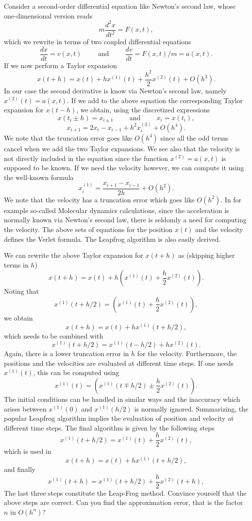 \documentclass[10pt]{article}
\begin{document}
Consider a second-order differential equation  like Newton's second law, whose one-dimensional 
version reads
\[
m\frac{d^2 x}{dt^2}= F(x,t),
\] 
which we rewrite in terms of two coupled differential equations
\[
\frac{dx}{dt}=v(x,t) \hspace{1cm}\mathrm{and}\hspace{1cm} \frac{dv}{dt}=F(x,t)/m=a(x,t).
\]
If we now perform a Taylor expansion 
\[
x(t+h) = x(t)+hx^{(1)}(t)+\frac{h^2}{2}x^{(2)}(t)+O(h^3).
\]
In our case the second derivative is know via Newton's second law, namely $x^{(2)}(t)=a(x,t)$. 
If we add to the above equation the corresponding Taylor expansion for $x(t-h)$, we obtain, using the 
discretized expressions 
\[
x(t_i\pm h) = x_{i\pm 1} \hspace{1cm}\mathrm{and}\hspace{1cm} x_i=x(t_i),
\]
\[
x_{i+1}= 2x_i-x_{i- 1}+h^2x^{(2)}_i+O(h^4).
\]
We note that the truncation error goes like $O(h^4)$ since all the odd terms cancel when we add the two Taylor expansions.
We see also that the velocity is not directly included in the equation since the function 
$x^{(2)}=a(x,t)$ is supposed to be known. If we need the velocity however, we can compute it using the well-known
formula
\[
x^{(1)}_i=\frac{x_{i+1}-x_{i-1}}{2h}+O(h^2).
\]
We note that the velocity has a truncation error which goes like $O(h^2)$. In for example so-called Molecular dynamics calculations,
since the acceleration is normally known via Newton's second law, there is seldomly a need for computing the velocity. 
The above sets of equations for the position $x(t)$ and the velocity defines the Verlet formula. The Leapfrog algorithm 
is also easily derived.

We can rewrite the above Taylor expansion for $x(t+h)$ as (skipping higher terms in $h$)
\[
x(t+h) = x(t)+h\left(x^{(1)}(t)+\frac{h}{2}x^{(2)}(t)\right).
\]
Noting that 
\[
x^{(1)}(t+h/2)=\left(x^{(1)}(t)+\frac{h}{2}x^{(2)}(t)\right),
\]
we obtain 
\[
x(t+h) = x(t)+hx^{(1)}(t+h/2),
\]
which needs to be combined with 
\[
x^{(1)}(t+h/2)=x^{(1)}(t-h/2)+hx^{(2)}(t).
\]
Again, there is a lower truncation error in $h$ for the velocity. Furthermore, the positions and the velocities are evaluated 
at different time steps.  If one needs $x^{(1)}(t)$, this can be computed using 
\[
x^{(1)}(t)=\left(x^{(1)}(t\mp h/2)\pm\frac{h}{2}x^{(2)}(t)\right).
\]
The initial conditions can be handled in similar ways and the inaccuracy which arises between 
$x^{(1)}(0)$ and $x^{(1)}(h/2)$ is normally ignored. 
Summarizing, the popular Leapfrog algorithm implies the evaluation of position and velocity at different time steps. The 
final algorithm is given by the following steps
\[
x^{(1)}(t+h/2)=x^{(1)}(t)+\frac{h}{2}x^{(2)}(t),
\]
which is used in 
\[
x(t+h) = x(t)+hx^{(1)}(t+h/2),
\]
and finally 
\[
x^{(1)}(t+h)=x^{(1)}(t+h/2)+\frac{h}{2}x^{(2)}(t+h),
\]
The last three steps constitute the Leap-Frog method. Convince yourself that the above steps are correct. Can you find
the approximation error, that is the factor $n$ in  $O(h^n)$?
\end{document}

